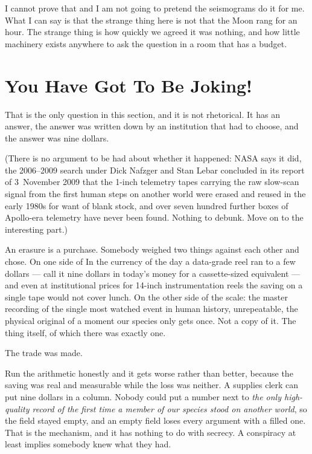 I cannot prove that and I am not going to pretend the seismograms do it for me. What I can say is
that the strange thing here is not that the Moon rang for an hour. The strange thing is how quickly
we agreed it was nothing, and how little machinery exists anywhere to ask the question in a room that
has a budget.

\section{You Have Got To Be Joking!}\label{sec:youhavegotbejoking}

 That is the only question in
this section, and it is not rhetorical. It has an answer, the answer was written down by an
institution that had to choose, and the answer was nine dollars.

(There is no argument to be had about whether it happened: NASA says it did, the 2006--2009 search
under Dick Nafzger and Stan Lebar concluded in its report of 3~November 2009 that the 1-inch
telemetry tapes carrying the raw slow-scan signal from the first human steps on another world were
erased and reused in the early 1980s for want of blank stock, and over seven hundred further boxes of
Apollo-era telemetry have never been found. Nothing to debunk. Move on to the interesting part.)

An erasure is a purchase. Somebody weighed two things against each other and chose. On one side of
In the currency of the day a data-grade reel ran to a
few dollars --- call it nine dollars in today's money for a cassette-sized equivalent --- and even at
institutional prices for 14-inch instrumentation reels the saving on a single tape would not cover
lunch. On the other side of the scale: the master recording of the single most watched event in human
history, unrepeatable, the physical original of a moment our species only gets once. Not a copy of
it. The thing itself, of which there was exactly one.

The trade was made. 

Run the arithmetic honestly and it gets worse rather than better, because the saving was real and
measurable while the loss was neither. A supplies clerk can put nine dollars in a column. Nobody
could put a number next to \emph{the only high-quality record of the first time a member of our
species stood on another world}, so the field stayed empty, and an empty field loses every argument
with a filled one.  That is the mechanism, and it has nothing to do
with secrecy. A conspiracy at least implies somebody knew what they had.

